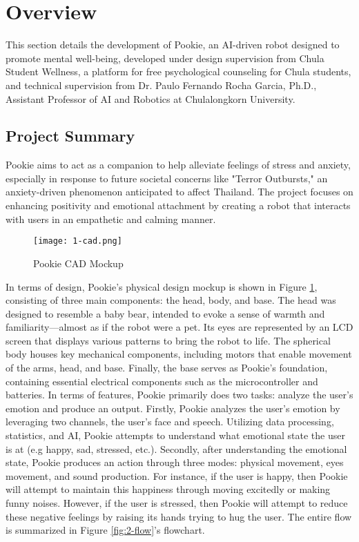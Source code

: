 \section{Overview}
This section details the development of Pookie, an AI-driven robot designed to promote mental well-being, developed under design supervision from Chula Student Wellness, a platform for free psychological counseling for Chula students, and technical supervision from Dr. Paulo Fernando Rocha Garcia, Ph.D., Assistant Professor of AI and Robotics at Chulalongkorn University. 

\subsection{Project Summary}
Pookie aims to act as a companion to help alleviate feelings of stress and anxiety, especially in response to future societal concerns like "Terror Outbursts," an anxiety-driven phenomenon anticipated to affect Thailand. The project focuses on enhancing positivity and emotional attachment by creating a robot that interacts with users in an empathetic and calming manner. 

\begin{figure}[ht]
    \centering
    \texttt{[image: 1-cad.png]}
    \captionsetup{justification=centering}
    \caption{Pookie CAD Mockup}
    \label{fig:1-cad}
\end{figure}

In terms of design, Pookie’s physical design mockup is shown in Figure \ref{fig:1-cad}, consisting of three main components: the head, body, and base. The head was designed to resemble a baby bear, intended to evoke a sense of warmth and familiarity—almost as if the robot were a pet. Its eyes are represented by an LCD screen that displays various patterns to bring the robot to life. The spherical body houses key mechanical components, including motors that enable movement of the arms, head, and base. Finally, the base serves as Pookie’s foundation, containing essential electrical components such as the microcontroller and batteries.
\newpage
In terms of features, Pookie primarily does two tasks: analyze the user’s emotion and produce an output. Firstly, Pookie analyzes the user’s emotion by leveraging two channels, the user's face and speech. Utilizing data processing, statistics, and AI, Pookie attempts to understand what emotional state the user is at (e.g happy, sad, stressed, etc.). Secondly, after understanding the emotional state, Pookie produces an action through three modes: physical movement, eyes movement, and sound production. For instance, if the user is happy, then Pookie will attempt to maintain this happiness through moving excitedly or making funny noises. However, if the user is stressed, then Pookie will attempt to reduce these negative feelings by raising its hands trying to hug the user. The entire flow is summarized in Figure \ref{fig:2-flow}’s flowchart.

